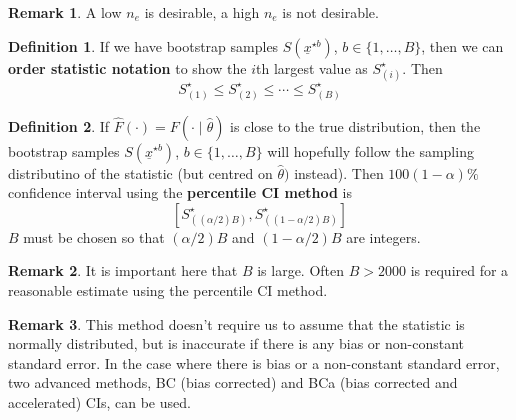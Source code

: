 \documentclass[12pt,a4paper]{article}
\theoremstyle{definition}
\newtheorem{definition}{Definition}[subsection]
\newtheorem*{remark}{Remark}
\begin{document}
\begin{remark}
	A low $n_e$ is desirable, a high $n_e$ is not desirable.
\end{remark}

\begin{definition}
	If we have bootstrap samples $S(\underline{x}^{\star b})$, $b \in \{ 1, \dots, B \}$, then we can \textbf{order statistic notation} to show the $i$th largest value as $S_{(i)}^{\star}$. Then
	\[
		S_{(1)}^{\star} \le S_{(2)}^{\star} \le \cdots \le S_{(B)}^{\star}
	\]
\end{definition}

\begin{definition}
	If $\hat{F}(\cdot) = F(\cdot \mid \hat{\theta})$ is close to the true distribution, then the bootstrap samples $S(\underline{x}^{\star b})$, $b \in \{ 1, \dots, B \}$ will hopefully follow the sampling distributino of the statistic (but centred on $\hat{\theta})$ instead). Then $100(1 - \alpha)\%$ confidence interval using the \textbf{percentile CI method} is
	\[
		\left[ S_{((\alpha / 2) B)}^{\star}, S_{((1 - \alpha / 2) B)}^{\star} \right]
	\]
	$B$ must be chosen so that $(\alpha / 2) B$ and $(1 - \alpha / 2) B$ are integers.
\end{definition}

\begin{remark}
	It is important here that $B$ is large. Often $B > 2000$ is required for a reasonable estimate using the percentile CI method.
\end{remark}

\begin{remark}
	This method doesn't require us to assume that the statistic is normally distributed, but is inaccurate if there is any bias or non-constant standard error. In the case where there is bias or a non-constant standard error, two advanced methods, BC (bias corrected) and BCa (bias corrected and accelerated) CIs, can be used.
\end{remark}
\end{document}
